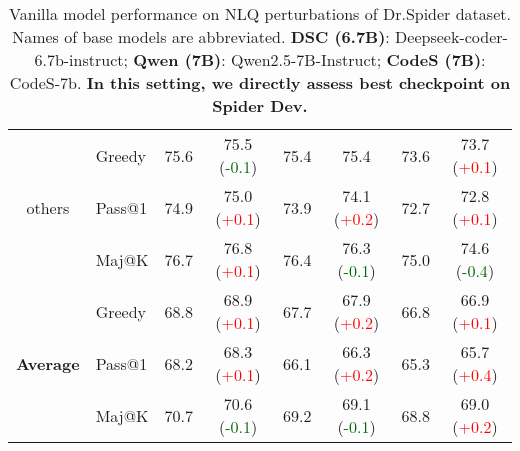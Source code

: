 \begin{table*}[t!]
\begin{adjustbox}{max width=\textwidth}
\begin{tabular}{c | l | c c | c c | c c }
        \multirow{3}{*}{others} & Greedy & 75.6 & 75.5 (\textcolor{darkgreen}{-0.1}) & 75.4 & 75.4 \phantom{(+0.3)} & 73.6 & 73.7 (\textcolor{red}{+0.1}) \\
& Pass@1 & 74.9 & 75.0 (\textcolor{red}{+0.1}) & 73.9 & 74.1 (\textcolor{red}{+0.2}) & 72.7 & 72.8 (\textcolor{red}{+0.1}) \\
& Maj@K & 76.7 & 76.8 (\textcolor{red}{+0.1}) & 76.4 & 76.3 (\textcolor{darkgreen}{-0.1}) & 75.0 & 74.6 (\textcolor{darkgreen}{-0.4}) \\
 \midrule

        \multirow{3}{*}{\textbf{Average}} & Greedy & 68.8 & 68.9 (\textcolor{red}{+0.1}) & 67.7 & 67.9 (\textcolor{red}{+0.2}) & 66.8 & 66.9 (\textcolor{red}{+0.1}) \\
& Pass@1 & 68.2 & 68.3 (\textcolor{red}{+0.1}) & 66.1 & 66.3 (\textcolor{red}{+0.2}) & 65.3 & 65.7 (\textcolor{red}{+0.4}) \\
& Maj@K & 70.7 & 70.6 (\textcolor{darkgreen}{-0.1}) & 69.2 & 69.1 (\textcolor{darkgreen}{-0.1}) & 68.8 & 69.0 (\textcolor{red}{+0.2}) \\

        
        \bottomrule
    \end{tabular}
\end{adjustbox}
    \caption{Vanilla model performance on NLQ perturbations of Dr.Spider dataset. Names of base models are abbreviated. \textbf{DSC (6.7B)}: Deepseek-coder-6.7b-instruct; \textbf{Qwen (7B)}: Qwen2.5-7B-Instruct; \textbf{CodeS (7B)}: CodeS-7b. \textbf{In this setting, we directly assess best checkpoint on Spider Dev.}} 
    \label{tab:drSpiderNLQVanilla}
\end{table*}